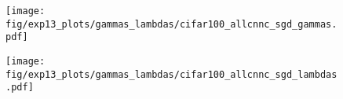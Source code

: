 \begin{figure*}[p]
  \begin{subfigure}[t]{\linewidth}
    \centering
    \caption{\cifarhun \allcnnc \sgd}
    \begin{minipage}{0.50\linewidth}
      \centering
      \texttt{[image: fig/exp13\_plots/gammas\_lambdas/cifar100\_allcnnc\_sgd\_gammas.pdf]}
    \end{minipage}\hfill
    \begin{minipage}{0.50\linewidth}
      \centering
      \texttt{[image: fig/exp13\_plots/gammas\_lambdas/cifar100\_allcnnc\_sgd\_lambdas.pdf]}
    \end{minipage}
  \end{subfigure}


\end{figure*}
